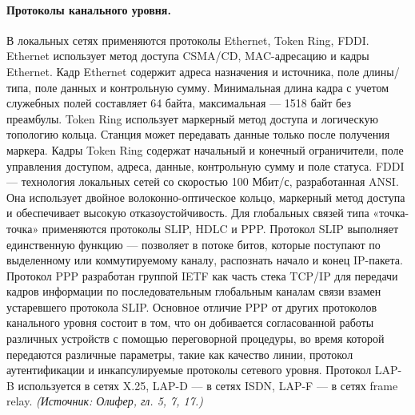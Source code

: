 \documentclass[a4paper,12pt]{article}
\begin{document}
\paragraph{Протоколы канального уровня.}
В локальных сетях применяются протоколы Ethernet, Token Ring, FDDI. Ethernet использует метод доступа CSMA/CD, MAC-адресацию и кадры Ethernet. Кадр Ethernet содержит адреса назначения и источника, поле длины/типа, поле данных и контрольную сумму. Минимальная длина кадра с учетом служебных полей составляет 64 байта, максимальная — 1518 байт без преамбулы. Token Ring использует маркерный метод доступа и логическую топологию кольца. Станция может передавать данные только после получения маркера. Кадры Token Ring содержат начальный и конечный ограничители, поле управления доступом, адреса, данные, контрольную сумму и поле статуса. FDDI — технология локальных сетей со скоростью 100 Мбит/с, разработанная ANSI. Она использует двойное волоконно-оптическое кольцо, маркерный метод доступа и обеспечивает высокую отказоустойчивость. Для глобальных связей типа «точка-точка» применяются протоколы SLIP, HDLC и PPP. Протокол SLIP выполняет единственную функцию — позволяет в потоке битов, которые поступают по выделенному или коммутируемому каналу, распознать начало и конец IP-пакета. Протокол PPP разработан группой IETF как часть стека TCP/IP для передачи кадров информации по последовательным глобальным каналам связи взамен устаревшего протокола SLIP. Основное отличие PPP от других протоколов канального уровня состоит в том, что он добивается согласованной работы различных устройств с помощью переговорной процедуры, во время которой передаются различные параметры, такие как качество линии, протокол аутентификации и инкапсулируемые протоколы сетевого уровня. Протокол LAP-B используется в сетях X.25, LAP-D — в сетях ISDN, LAP-F — в сетях frame relay.
\textit{(Источник: Олифер, гл. 5, 7, 17.)}
\end{document}
